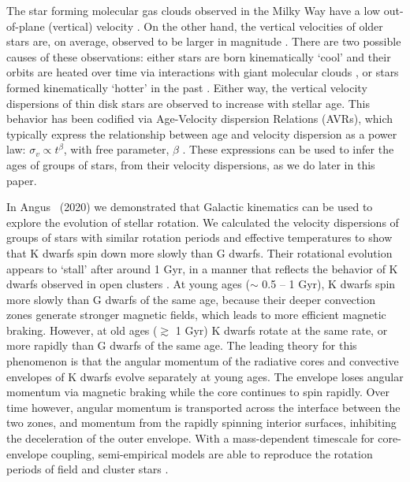 The star forming molecular gas clouds observed in the Milky Way have a low
out-of-plane (vertical) velocity \citep[\eg][]{stark1989, stark2005,
aumer2009, martig2014, aumer2016}.
On the other hand, the vertical velocities of older stars are, on average,
observed to be larger in magnitude \citep{stromberg1946, wielen1977,
nordstrom2004, holmberg2007, holmberg2009, aumer2009, casagrande2011,
ting2019, yu2019}.
There are two possible causes of these observations: either stars are born
kinematically `cool' and their orbits are heated over time via interactions
with giant molecular clouds \citep[see][for a review of secular evolution in
the MW]{Sellwood 2014}, or stars formed kinematically `hotter' in the past
\citep[\eg][]{bird2013}.
Either way, the vertical velocity dispersions of thin disk stars are observed
to increase with stellar age.
This behavior has been codified via Age-Velocity dispersion Relations (AVRs),
which typically express the relationship between age and velocity dispersion
as a power law: $\sigma_v \propto t^\beta$, with free parameter, $\beta$
\citep[\eg][]{nordstrom2009, yu2019}.
These expressions can be used to infer the ages of groups of stars, from their
velocity dispersions, as we do later in this paper.

In Angus \etal\ (2020) we demonstrated that Galactic kinematics can be used to
explore the evolution of stellar rotation.
We calculated the velocity dispersions of groups of stars with similar
rotation periods and effective temperatures to show that K dwarfs spin down
more slowly than G dwarfs.
Their rotational evolution appears to `stall' after around 1 Gyr, in a manner
that reflects the behavior of K dwarfs observed in open clusters
\citep{curtis2019}.
At young ages ($\sim$ 0.5 -- 1 Gyr), K dwarfs spin more slowly than G dwarfs of
the same age, because their deeper convection zones generate stronger magnetic
fields, which leads to more efficient magnetic braking.
However, at old ages ($\gtrsim$ 1 Gyr) K dwarfs rotate at the same rate, or
more rapidly than G dwarfs of the same age.
The leading theory for this phenomenon is that the angular momentum of the
radiative cores and convective envelopes of K dwarfs evolve separately at
young ages.
The envelope loses angular momentum via magnetic braking while the core
continues to spin rapidly.
Over time however, angular momentum is transported across the interface
between the two zones, and momentum from the rapidly spinning interior
surfaces, inhibiting the deceleration of the outer envelope.
With a mass-dependent timescale for core-envelope coupling, semi-empirical
models are able to reproduce the rotation periods of field and cluster stars
\citep[][Angus \etal, 2020]{spada2019, curtis2019}.

